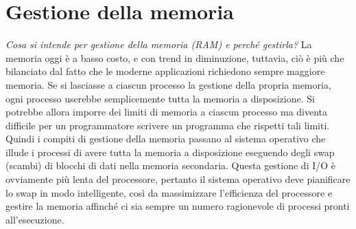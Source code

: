 \chapter{Gestione della memoria}
\textit{Cosa si intende per gestione della memoria (RAM) e perché gestirla?} La memoria oggi è a basso costo, e con trend in diminuzione, tuttavia, ciò è più che bilanciato dal fatto che le moderne applicazioni richiedono sempre maggiore memoria. Se si lasciasse a ciascun processo la gestione della propria memoria, ogni processo userebbe semplicemente tutta la memoria a disposizione. Si potrebbe allora imporre dei limiti di memoria a ciascun processo ma diventa difficile per un programmatore scrivere un programma che rispetti tali limiti. Quindi i compiti di gestione della memoria passano al sistema operativo che illude i processi di avere tutta la memoria a disposizione eseguendo degli swap (scambi) di blocchi di dati nella memoria secondaria. Questa gestione di I/O è ovviamente più lenta del processore, pertanto il sistema operativo deve pianificare lo swap in modo intelligente, così da massimizzare l'efficienza del processore e gestire la memoria affinché ci sia sempre un numero ragionevole di processi pronti all'esecuzione.

